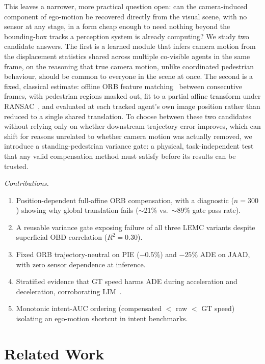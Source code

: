 \documentclass[conference]{IEEEtran}
\begin{document}
This leaves a narrower, more practical question open: can the
camera-induced component of ego-motion be recovered directly from the
visual scene, with no sensor at any stage, in a form cheap enough to
need nothing beyond the bounding-box tracks a perception system is
already computing? We study two candidate answers. The first is a
learned module that infers camera motion from the displacement
statistics shared across multiple co-visible agents in the same frame,
on the reasoning that true camera motion, unlike coordinated pedestrian
behaviour, should be common to everyone in the scene at once. The
second is a fixed, classical estimate: offline ORB feature
matching~\cite{rublee2011orb} between consecutive frames, with
pedestrian regions masked out, fit to a partial affine transform under
RANSAC~\cite{fischler1981ransac}, and evaluated at each tracked agent's
own image position rather than reduced to a single shared translation.
To choose between these two candidates without relying only on whether
downstream trajectory error improves, which can shift for reasons
unrelated to whether camera motion was actually removed, we introduce a
standing-pedestrian variance gate: a physical, task-independent test
that any valid compensation method must satisfy before its results can
be trusted.

\textit{Contributions.}
\begin{enumerate}[leftmargin=1.4em,itemsep=1pt,topsep=2pt]
    \item Position-dependent full-affine ORB compensation, with a
    diagnostic ($n=300$) showing why global translation fails
    ($\sim$21\% vs.\ $\sim$89\% gate pass rate).
    \item A reusable variance gate exposing failure of all three LEMC
    variants despite superficial OBD correlation ($R^2=0.30$).
    \item Fixed ORB trajectory-neutral on PIE ($-0.5\%$) and $-25\%$
    ADE on JAAD, with zero sensor dependence at inference.
    \item Stratified evidence that GT speed harms ADE during
    acceleration and deceleration, corroborating LIM~\cite{lim2025tits}.
    \item Monotonic intent-AUC ordering (compensated $<$ raw $<$ GT
    speed) isolating an ego-motion shortcut in intent benchmarks.
\end{enumerate}

\section{Related Work}
\label{sec:related}
\end{document}

